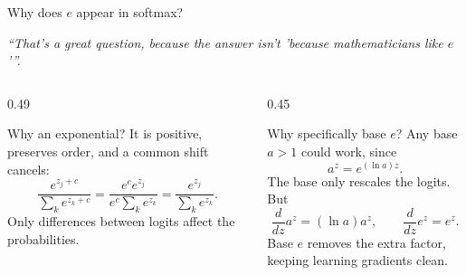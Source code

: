 \begin{frame}{Why does \(e\) appear in softmax?}
  \small
  \begin{center}
    \large\itshape
    ``That's a great question, because the answer isn't
    \emph{'because mathematicians like \(e\)'}''.
  \end{center}

  \begin{center}
  \end{center}

  \vspace{-1em}
  \begin{columns}[T,onlytextwidth]
    \begin{column}{0.49\textwidth}
      \begin{block}{Why an exponential?}
        \small
        It is positive, preserves order, and a common shift cancels:
        \[
          \frac{e^{z_j+c}}{\sum_k e^{z_k+c}}
          =\frac{e^c e^{z_j}}{e^c\sum_k e^{z_k}}
          =\frac{e^{z_j}}{\sum_k e^{z_k}}.
        \]
        Only differences between logits affect the probabilities.
      \end{block}
    \end{column}
    \begin{column}{0.45\textwidth}
      \begin{block}{Why specifically base \(e\)?}
        \small
        Any base \(a>1\) could work, since
        \[
          a^z=e^{(\ln a)z}.
        \]
        The base only rescales the logits. But
        \[
          \frac{d}{dz}a^z=(\ln a)a^z,
          \qquad
          \frac{d}{dz}e^z=e^z.
        \]
        Base \(e\) removes the extra factor, keeping learning gradients clean.
      \end{block}
    \end{column}
  \end{columns}
\end{frame}

